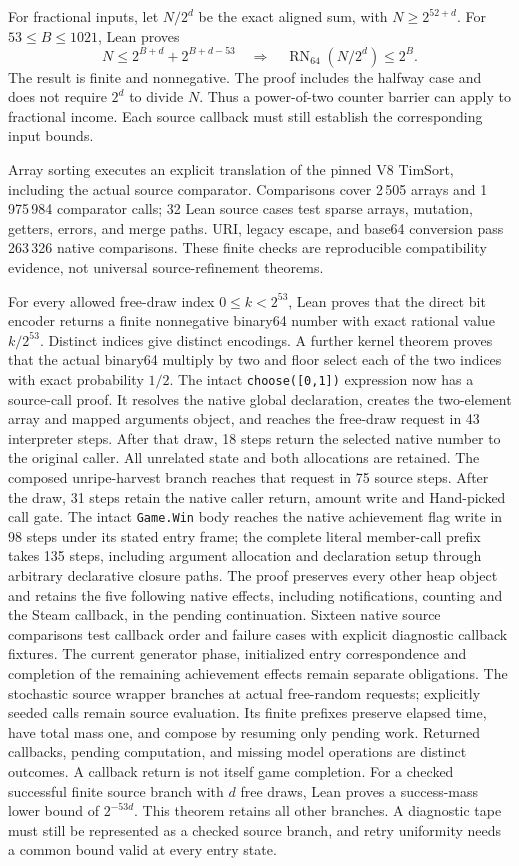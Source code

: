 \documentclass[11pt,a4paper]{article}
\numberwithin{equation}{section}
\theoremstyle{definition}
\theoremstyle{remark}
\begin{document}
For fractional inputs, let $N/2^d$ be the exact aligned sum, with $N\geq2^{52+d}$. For $53\leq B\leq1021$, Lean proves
\[
 N\leq2^{B+d}+2^{B+d-53}
 \quad\Longrightarrow\quad
 \operatorname{RN}_{64}(N/2^d)\leq2^B.
\]
The result is finite and nonnegative. The proof includes the halfway case and does not require $2^d$ to divide $N$. Thus a power-of-two counter barrier can apply to fractional income. Each source callback must still establish the corresponding input bounds.

Array sorting executes an explicit translation of the pinned V8 TimSort, including the actual source comparator. Comparisons cover 2\,505 arrays and 1\,975\,984 comparator calls; 32 Lean source cases test sparse arrays, mutation, getters, errors, and merge paths. URI, legacy escape, and base64 conversion pass 263\,326 native comparisons. These finite checks are reproducible compatibility evidence, not universal source-refinement theorems.

For every allowed free-draw index $0\leq k<2^{53}$, Lean proves that the direct bit encoder returns a finite nonnegative binary64 number with exact rational value $k/2^{53}$. Distinct indices give distinct encodings. A further kernel theorem proves that the actual binary64 multiply by two and floor select each of the two indices with exact probability $1/2$. The intact \texttt{choose([0,1])} expression now has a source-call proof. It resolves the native global declaration, creates the two-element array and mapped arguments object, and reaches the free-draw request in 43 interpreter steps. After that draw, 18 steps return the selected native number to the original caller. All unrelated state and both allocations are retained. The composed unripe-harvest branch reaches that request in 75 source steps. After the draw, 31 steps retain the native caller return, amount write and Hand-picked call gate. The intact \texttt{Game.Win} body reaches the native achievement flag write in 98 steps under its stated entry frame; the complete literal member-call prefix takes 135 steps, including argument allocation and declaration setup through arbitrary declarative closure paths. The proof preserves every other heap object and retains the five following native effects, including notifications, counting and the Steam callback, in the pending continuation. Sixteen native source comparisons test callback order and failure cases with explicit diagnostic callback fixtures. The current generator phase, initialized entry correspondence and completion of the remaining achievement effects remain separate obligations. The stochastic source wrapper branches at actual free-random requests; explicitly seeded calls remain source evaluation. Its finite prefixes preserve elapsed time, have total mass one, and compose by resuming only pending work. Returned callbacks, pending computation, and missing model operations are distinct outcomes. A callback return is not itself game completion. For a checked successful finite source branch with $d$ free draws, Lean proves a success-mass lower bound of $2^{-53d}$. This theorem retains all other branches. A diagnostic tape must still be represented as a checked source branch, and retry uniformity needs a common bound valid at every entry state.
\end{document}
